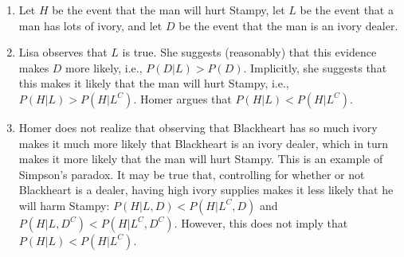 

\setcounter{theorem}{55}
\begin{exercise}[BH.2.56]
\begin{solution}
    \begin{enumerate}
        \item Let $H$ be the event that the man will hurt Stampy, let $L$ be the event that a man has lots of ivory, and let $D$ be the event that the man is an ivory dealer.
        \item Lisa observes that $L$ is true. She suggests (reasonably) that this evidence makes $D$ more likely, i.e., $P(D|L) > P(D)$. Implicitly, she suggests that this makes it likely that the man will hurt Stampy, i.e., $P(H|L) > P(H|L^C)$. Homer argues that $P(H|L) < P(H|L^C)$.
        \item Homer does not realize that observing that Blackheart has so much ivory makes it much more likely that Blackheart is an ivory dealer, which in turn makes it more likely that the man will hurt Stampy. This is an example of Simpson’s paradox. It may be true that, controlling for whether or not Blackheart is a dealer, having high ivory supplies makes it less likely that he will harm Stampy: $P(H|L, D) < P(H|L^C,D)$ and $P(H|L, D^C) < P(H|L^C,D^C)$. However, this does not imply that $P(H|L) < P(H|L^{C})$.
    \end{enumerate}
\end{solution}
\end{exercise}


